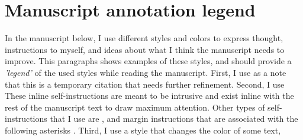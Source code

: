 \documentclass[12pt,titlepage]{article}
\begin{document}
\section*{Manuscript annotation legend}
In the manuscript below, I use different styles and colors to express thought, instructions to myself, and ideas about what I think the manuscript needs to improve. This paragraphs shows examples of these styles, and should provide a \emph{'legend'} of the used styles while reading the manuscript. First, I use  as a note that this is a temporary citation that needs further refinement. Second, I use  These inline self-instructions are meant to be intrusive and exist inline with the rest of the manuscript text to draw maximum attention. Other types of self-instructions that I use are , and margin instructions that are associated with the following asterisks . Third, I use a style that changes the color of some text, 
\end{document}
